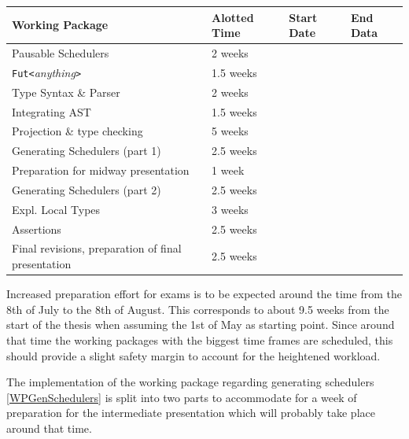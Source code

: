 \documentclass[paper=a4,nochapname,accentcolor=tud9c]{tudexercise}
\begin{document}
\begin{tabular}{llll}
Working Package & Alotted Time & Start Date & End Data \\
\hline
Pausable Schedulers & 2 weeks & & \\
\texttt{Fut<}\emph{anything}\texttt{>} & 1.5 weeks & & \\ %
Type Syntax \& Parser & 2 weeks & & \\
Integrating AST & 1.5 weeks & & \\ %
Projection \& type checking & 5 weeks & & \\
Generating Schedulers (part 1) & 2.5 weeks & & \\
Preparation for midway presentation & 1 week & & \\
Generating Schedulers (part 2) & 2.5 weeks & & \\
Expl. Local Types & 3 weeks & & \\
Assertions & 2.5 weeks & & \\
Final revisions, preparation of final presentation & 2.5 weeks & &
\end{tabular}

\medskip

Increased preparation effort for exams is to be expected around the time from
the 8th of July to the 8th of August. This corresponds to about 9.5 weeks from the
start of the thesis when assuming the 1st of May as starting point.
Since around that time the working packages with the biggest time frames are
scheduled, this should provide a slight safety margin to account for the
heightened workload.

The implementation of the working package regarding generating schedulers
\ref{WPGenSchedulers} is split into two parts to accommodate for a week of
preparation for the intermediate presentation which will probably take place
around that time.

\printbibliography[heading=bibnumbered]
\end{document}
